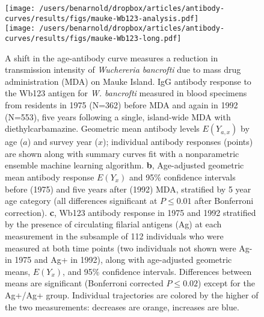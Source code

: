 \documentclass[11pt]{article}
\begin{document}
\begin{figure}[htbp]
\begin{center}
\texttt{[image: /users/benarnold/dropbox/articles/antibody-curves/results/figs/mauke-Wb123-analysis.pdf]} \\
\texttt{[image: /users/benarnold/dropbox/articles/antibody-curves/results/figs/mauke-Wb123-long.pdf]}
\begin{minipage}{\textwidth}
\caption{A shift in the age-antibody curve measures a reduction in transmission intensity of \textit{Wuchereria bancrofti} due to mass drug administration (MDA) on Mauke Island.  IgG antibody response to the Wb123 antigen for \textit{W. bancrofti} measured in blood specimens from residents in 1975 (N=362) before MDA and again in 1992 (N=553), five years following a single, island-wide MDA with diethylcarbamazine. Geometric mean antibody levels $E(Y_{a,x})$ by age ($a$) and survey year ($x$); individual antibody responses (points) are shown along with summary curves fit with a nonparametric ensemble machine learning algorithm. \textbf{b}, Age-adjusted geometric mean antibody response $E(Y_{x})$ and 95\% confidence intervals before (1975) and five years after (1992) MDA, stratified by 5 year age category (all differences significant at $P\leq0.01$ after Bonferroni correction). \textbf{c}, Wb123 antibody response in 1975 and 1992 stratified by the presence of circulating filarial antigens (Ag) at each measurement in the subsample of 112 individuals who were measured at both time points (two individuals not shown were Ag- in 1975 and Ag+ in 1992), along with age-adjusted geometric means, $E(Y_{x})$, and 95\% confidence intervals. Differences between means are significant (Bonferroni corrected $P\leq0.02$) except for the Ag+/Ag+ group. Individual trajectories are colored by the higher of the two measurements: decreases are orange, increases are blue. }
\label{fig:mauke}
\end{minipage}
\end{center}
\end{figure}
\end{document}
